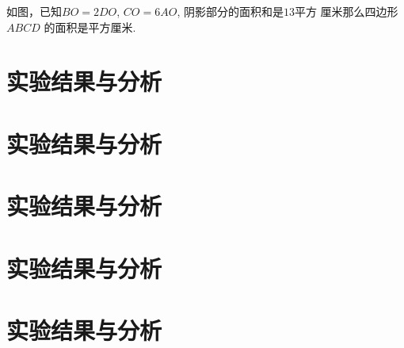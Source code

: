 \documentclass{USTBBook}
\begin{document}
\begin{question}
  如图，已知$BO=2DO$, $CO=6AO$, 阴影部分的面积和是$13$平方
  厘米那么四边形 $ABCD$ 的面积是\fillin[]平方厘米.
\end{question}

\chapter{实验结果与分析}
\zhlipsum[14]

\chapter{实验结果与分析}
\zhlipsum[14]

\chapter{实验结果与分析}
\zhlipsum[14]

\chapter{实验结果与分析}
\zhlipsum[14]

\chapter{实验结果与分析}
\zhlipsum[14]

\backmatter
\makeBackCover
\end{document}
